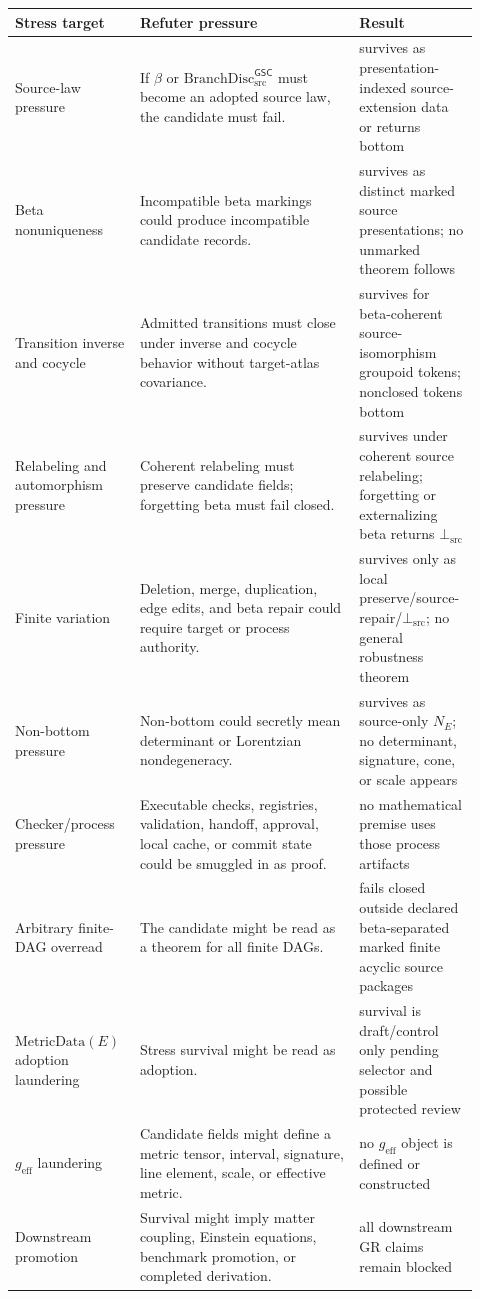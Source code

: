\documentclass[11pt]{article}
\newcommand{\BranchDisc}{\mathrm{BranchDisc}_{\mathrm{src}}^{\mathsf{GSC}}}
\newcommand{\geff}{g_{\mathrm{eff}}}
\newcommand{\Bottom}{\bot_{\mathrm{src}}}
\begin{document}
\begin{longtable}{p{0.24\linewidth}p{0.45\linewidth}p{0.23\linewidth}}
\toprule
Stress target & Refuter pressure & Result \\
\midrule
Source-law pressure & If \(\beta\) or \(\BranchDisc\) must become an adopted
source law, the candidate must fail. & survives as presentation-indexed
source-extension data or returns bottom \\
Beta nonuniqueness & Incompatible beta markings could produce incompatible
candidate records. & survives as distinct marked source presentations; no
unmarked theorem follows \\
Transition inverse and cocycle & Admitted transitions must close under inverse
and cocycle behavior without target-atlas covariance. & survives for
beta-coherent source-isomorphism groupoid tokens; nonclosed tokens bottom \\
Relabeling and automorphism pressure & Coherent relabeling must preserve
candidate fields; forgetting beta must fail closed. & survives under coherent
source relabeling; forgetting or externalizing beta returns \(\Bottom\) \\
Finite variation & Deletion, merge, duplication, edge edits, and beta repair
could require target or process authority. & survives only as local
preserve/source-repair/\(\Bottom\); no general robustness theorem \\
Non-bottom pressure & Non-bottom could secretly mean determinant or
Lorentzian nondegeneracy. & survives as source-only \(N_E\); no determinant,
signature, cone, or scale appears \\
Checker/process pressure & Executable checks, registries, validation, handoff,
approval, local cache, or commit state could be smuggled in as proof. & no
mathematical premise uses those process artifacts \\
Arbitrary finite-DAG overread & The candidate might be read as a theorem for
all finite DAGs. & fails closed outside declared beta-separated marked finite
acyclic source packages \\
\(\mathrm{MetricData}(E)\) adoption laundering & Stress survival might be read
as adoption. & survival is draft/control only pending selector and possible
protected review \\
\(\geff\) laundering & Candidate fields might define a metric tensor, interval,
signature, line element, scale, or effective metric. & no \(\geff\) object is
defined or constructed \\
Downstream promotion & Survival might imply matter coupling, Einstein
equations, benchmark promotion, or completed derivation. & all downstream GR
claims remain blocked \\
\bottomrule
\end{longtable}
\end{document}
